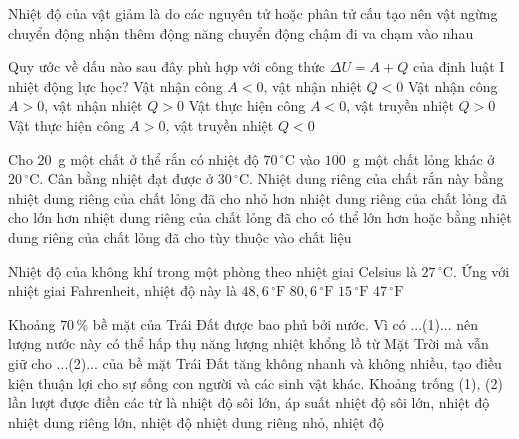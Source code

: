 	\begin{ex}%
		Nhiệt độ của vật giảm là do các nguyên tử hoặc phân tử cấu tạo nên vật
		\choice
		{ngừng chuyển động}
		{nhận thêm động năng}
		{\True chuyển động chậm đi}
		{va chạm vào nhau}
	\end{ex}

	\begin{ex}%
		Quy ước về dấu nào sau đây phù hợp với công thức $\Delta U=A+Q$ của định luật I nhiệt động lực học?
		\choice
		{Vật nhận công $A<0$, vật nhận nhiệt $Q<0$}
		{\True Vật nhận công $A>0$, vật nhận nhiệt $Q>0$}
		{Vật thực hiện công $A<0$, vật truyền nhiệt $Q>0$}
		{Vật thực hiện công $A>0$, vật truyền nhiệt $Q<0$}
	\end{ex}

	\begin{ex}%
		Cho $20$~g một chất ở thể rắn có nhiệt độ $70\,^\circ\text{C}$ vào $100$~g một chất lỏng khác ở $20\,^\circ\text{C}$. Cân bằng nhiệt đạt được ở $30\,^\circ\text{C}$. Nhiệt dung riêng của chất rắn này
		\choice
		{bằng nhiệt dung riêng của chất lỏng đã cho}
		{nhỏ hơn nhiệt dung riêng của chất lỏng đã cho}
		{\True lớn hơn nhiệt dung riêng của chất lỏng đã cho}
		{có thể lớn hơn hoặc bằng nhiệt dung riêng của chất lỏng đã cho tùy thuộc vào chất liệu}
	\end{ex}

	\begin{ex}%
		Nhiệt độ của không khí trong một phòng theo nhiệt giai Celsius là $27\,^\circ\text{C}$. Ứng với nhiệt giai Fahrenheit, nhiệt độ này là
		\choice
		{$48{,}6\,^\circ\text{F}$}
		{\True $80{,}6\,^\circ\text{F}$}
		{$15\,^\circ\text{F}$}
		{$47\,^\circ\text{F}$}
	\end{ex}

	\begin{ex}%
		Khoảng $70\,\%$ bề mặt của Trái Đất được bao phủ bởi nước. Vì có ...(1)... nên lượng nước này có thể hấp thụ năng lượng nhiệt khổng lồ từ Mặt Trời mà vẫn giữ cho ...(2)... của bề mặt Trái Đất tăng không nhanh và không nhiều, tạo điều kiện thuận lợi cho sự sống con người và các sinh vật khác. Khoảng trống (1), (2) lần lượt được điền các từ là
		\choice
		{nhiệt độ sôi lớn, áp suất}
		{nhiệt độ sôi lớn, nhiệt độ}
		{\True nhiệt dung riêng lớn, nhiệt độ}
		{nhiệt dung riêng nhỏ, nhiệt độ}
	\end{ex}

